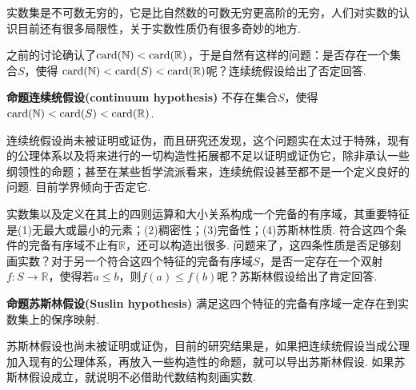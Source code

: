 \documentclass[UTF8]{ctexart}
\newcommand{\trm}[1]{{\rm #1}}
\newenvironment{proposition}[1]
    {\begin{tcolorbox}[enhanced, colback=LightYellow, breakable=true, frame hidden, borderline west={1.5mm}{-2mm}{Purple}]
    {\bfseries {\color{Purple} 命题}\quad #1} \newline}
    {\end{tcolorbox}}
\begin{document}
实数集是不可数无穷的，它是比自然数的可数无穷更高阶的无穷，人们对实数的认识目前还有很多局限性，关于实数性质仍有很多奇妙的地方.

之前的讨论确认了\(\trm{card}(\mathbb{N})<\trm{card}(\mathbb{R})\)，于是自然有这样的问题：是否存在一个集合\(S\)，使得 \(\trm{card}(\mathbb{N}) < \trm{card}(S) < \trm{card}(\mathbb{R})\)呢？连续统假设给出了否定回答.

\begin{proposition}{连续统假设(continuum hypothesis)}
    不存在集合\(S\)，使得\(\trm{card}(\mathbb{N})<\trm{card}(S)<\trm{card}(\mathbb{R})\).
\end{proposition}

连续统假设尚未被证明或证伪，而且研究还发现，这个问题实在太过于特殊，现有的公理体系以及将来进行的一切构造性拓展都不足以证明或证伪它，除非承认一些纲领性的命题；甚至在某些哲学流派看来，连续统假设甚至都不是一个定义良好的问题. 目前学界倾向于否定它.

实数集以及定义在其上的四则运算和大小关系构成一个完备的有序域，其重要特征是(1)无最大或最小的元素；(2)稠密性；(3)完备性；(4)苏斯林性质. 符合这四个条件的完备有序域不止有\(\mathbb{R}\)，还可以构造出很多. 问题来了，这四条性质是否足够刻画实数？对于另一个符合这四个特征的完备有序域\(S\)，是否一定存在一个双射\(f:S\to \mathbb{R}\)，使得若\(a\leq b\)，则\(f(a)\leq f(b)\)呢？苏斯林假设给出了肯定回答.
\begin{proposition}{苏斯林假设(Suslin hypothesis)}
    满足这四个特征的完备有序域一定存在到实数集上的保序映射.
\end{proposition}

苏斯林假设也尚未被证明或证伪，目前的研究结果是，如果把连续统假设当成公理加入现有的公理体系，再放入一些构造性的命题，就可以导出苏斯林假设. 如果苏斯林假设成立，就说明不必借助代数结构刻画实数.

\vspace{1cm}
\end{document}
